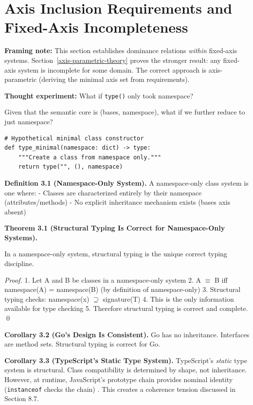 \section{Axis Inclusion Requirements and Fixed-Axis Incompleteness}\label{universal-dominance}

\textbf{Framing note:} This section establishes dominance relations \emph{within} fixed-axis systems. Section~\ref{axis-parametric-theory} proves the stronger result: any fixed-axis system is incomplete for some domain. The correct approach is axis-parametric (deriving the minimal axis set from requirements).

\textbf{Thought experiment:} What if \texttt{type()} only took
namespace?

Given that the semantic core is (bases, namespace), what if we further
reduce to just namespace?

\begin{verbatim}
# Hypothetical minimal class constructor
def type_minimal(namespace: dict) -> type:
    """Create a class from namespace only."""
    return type("", (), namespace)
\end{verbatim}

\textbf{Definition 3.1 (Namespace-Only System).} A namespace-only class
system is one where: - Classes are characterized entirely by their
namespace (attributes/methods) - No explicit inheritance mechanism
exists (bases axis absent)

\textbf{Theorem 3.1 (Structural Typing Is Correct for Namespace-Only
Systems).}

In a namespace-only system, structural typing is the unique correct
typing discipline.

\emph{Proof.} 1. Let A and B be classes in a namespace-only system 2. A
\(\equiv\) B iff namespace(A) = namespace(B) (by definition of
namespace-only) 3. Structural typing checks: namespace(x) \(\supseteq\)
signature(T) 4. This is the only information available for type checking
5. Therefore structural typing is correct and complete. \qed

\textbf{Corollary 3.2 (Go's Design Is Consistent).} Go has no
inheritance. Interfaces are method sets. Structural typing is correct
for Go.

\textbf{Corollary 3.3 (TypeScript's Static Type System).} TypeScript's
\emph{static} type system is structural. Class compatibility is
determined by shape, not inheritance. However, at runtime, JavaScript's
prototype chain provides nominal identity (\texttt{instanceof} checks
the chain) \cite{mdnPrototypeChain}. This creates a coherence tension
discussed in Section 8.7.

